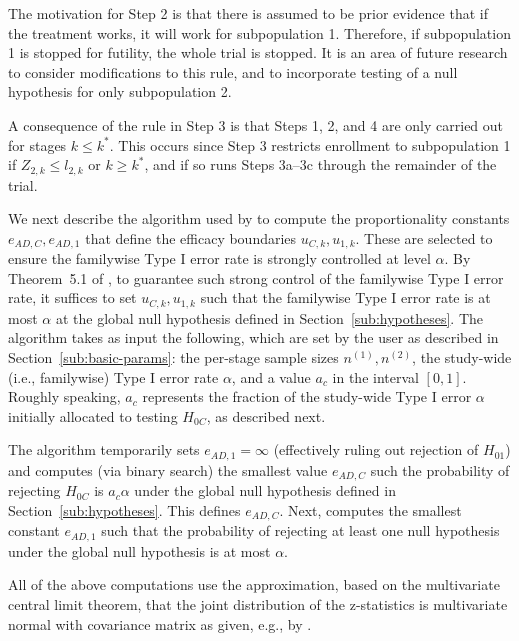 \documentclass[article]{jss}
\begin{document}
The motivation for Step 2 is that there is assumed to be prior evidence that if the treatment works, it will work for subpopulation 1. Therefore, if subpopulation 1 is stopped for futility, the whole trial is stopped. It is an area of future research to consider modifications to this rule, and to incorporate testing of a null hypothesis for only subpopulation 2.

A consequence of the rule in Step 3 is that Steps 1, 2, and 4 are only carried out for stages $k\leq k^*$.  This occurs since 
 Step 3 restricts enrollment to subpopulation 1 if $Z_{2,k} ≤ l_{2,k}$ or  $k\geq k^*$, and if so runs Steps 3a--3c through the remainder of the trial.

We next describe the algorithm used by   to compute the proportionality constants $e_{AD,C}, e_{AD,1}$ that define the efficacy boundaries $u_{C,k},u_{1,k}$. These are selected to ensure the familywise Type I error rate is strongly controlled at level $\alpha$. By Theorem~5.1 of  \citep{Rosenblum2013AdaptMISTIE}, to guarantee such strong control of the familywise Type I error rate, it suffices to set $u_{C,k},u_{1,k}$ such that the familywise Type I error rate is at most $\alpha$ at the global null hypothesis defined in Section~\ref{sub:hypotheses}.
The algorithm takes as input the following, which are set by the user as described in Section~\ref{sub:basic-params}: the per-stage sample sizes $n^{(1)},n^{(2)}$, the study-wide (i.e., familywise) Type I error rate $\alpha$, and a value $a_c$ in the interval $[0,1]$. 
Roughly speaking, $a_c$ represents the fraction of the study-wide Type I error $\alpha$ initially allocated to testing $H_{0C}$, as described next.

The algorithm temporarily sets $e_{AD,1}= \infty$ (effectively ruling out rejection of $H_{01}$)
and computes (via binary search) the smallest value $e_{AD,C}$ such the probability of rejecting $H_{0C}$ is $a_c α$ under the global null hypothesis defined in Section~\ref{sub:hypotheses}. This defines $e_{AD,C}$. 
Next,   computes the smallest constant $e_{AD,1}$ such that the probability of rejecting at least one null hypothesis under the global null hypothesis  is at most $\alpha$. 

All of the above computations use the approximation, based on the multivariate central limit theorem, that the joint distribution of the  z-statistics is multivariate normal  with covariance matrix as given, e.g., by \cite{JennisonTurnbullBook,Rosenblum2013AdaptMISTIE}.
\end{document}
